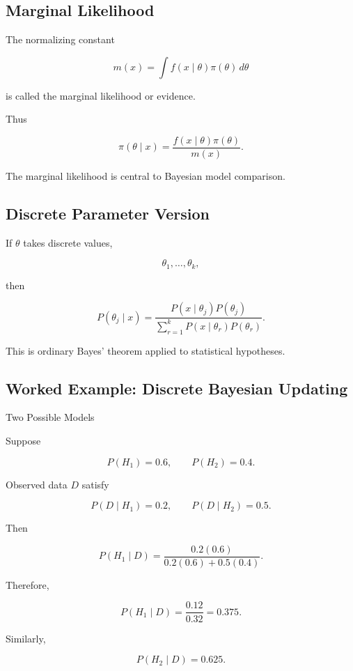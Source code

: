 \subsection{Marginal Likelihood}
\label{subsec:marginal-likelihood}

The normalizing constant

\[
\boxed{
m(x)
=
\int
f(x\mid\theta)\pi(\theta)\,d\theta
}
\]

is called the marginal likelihood or evidence.

Thus

\[
\boxed{
\pi(\theta\mid x)
=
\frac{
f(x\mid\theta)\pi(\theta)
}{
m(x)
}.
}
\]

The marginal likelihood is central to Bayesian model comparison.

\subsection{Discrete Parameter Version}
\label{subsec:discrete-parameter-bayes}

If \(\theta\) takes discrete values,

\[
\theta_1,\ldots,\theta_k,
\]

then

\[
\boxed{
P(\theta_j\mid x)
=
\frac{
P(x\mid\theta_j)P(\theta_j)
}{
\sum_{r=1}^{k}
P(x\mid\theta_r)P(\theta_r)
}.
}
\]

This is ordinary Bayes' theorem applied to statistical hypotheses.

\subsection{Worked Example: Discrete Bayesian Updating}
\label{subsec:worked-discrete-bayes}

\begin{workedexamplebox}{Two Possible Models}

Suppose

\[
P(H_1)=0.6,
\qquad
P(H_2)=0.4.
\]

Observed data \(D\) satisfy

\[
P(D\mid H_1)=0.2,
\qquad
P(D\mid H_2)=0.5.
\]

Then

\[
P(H_1\mid D)
=
\frac{
0.2(0.6)
}{
0.2(0.6)+0.5(0.4)
}.
\]

Therefore,

\begin{answerbox}
\[
\boxed{
P(H_1\mid D)
=
\frac{0.12}{0.32}
=
0.375.
}
\]

Similarly,

\[
\boxed{
P(H_2\mid D)
=
0.625.
}
\]
\end{answerbox}

\end{workedexamplebox}

